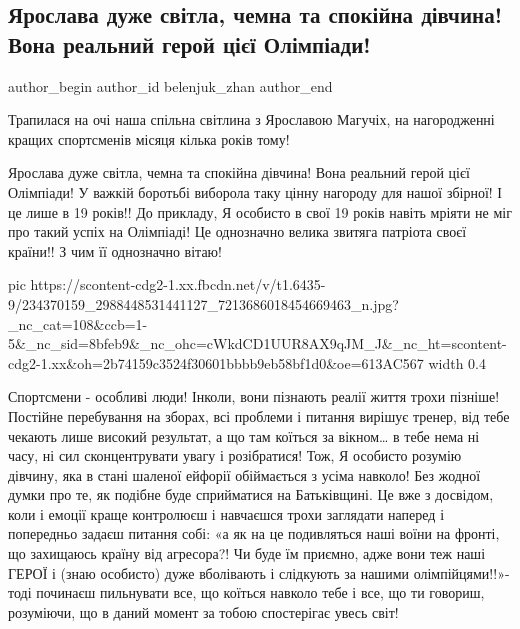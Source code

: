  
 
 
 
 
 
\subsection{Ярослава дуже світла, чемна та спокійна дівчина! Вона реальний герой цієї Олімпіади!}
\label{sec:10_08_2021.fb.belenjuk_zhan.1.maguchih_foto}
 
\ifcmt
 author_begin
   author_id belenjuk_zhan
 author_end
\fi

Трапилася на очі наша спільна світлина з Ярославою Магучіх, на нагородженні
кращих спортсменів місяця кілька років тому! 

Ярослава дуже світла, чемна та спокійна дівчина! Вона реальний герой цієї
Олімпіади! У важкій боротьбі виборола таку цінну нагороду для нашої збірної! І
це лише в 19 років!! До прикладу, Я особисто в свої 19 років навіть мріяти не
міг про такий успіх на Олімпіаді! Це однозначно велика звитяга патріота своєї
країни!! З чим її однозначно вітаю!

\ifcmt
  pic https://scontent-cdg2-1.xx.fbcdn.net/v/t1.6435-9/234370159_2988448531441127_7213686018454669463_n.jpg?_nc_cat=108&ccb=1-5&_nc_sid=8bfeb9&_nc_ohc=cWkdCD1UUR8AX9qJM_J&_nc_ht=scontent-cdg2-1.xx&oh=2b74159c3524f30601bbbb9eb58bf1d0&oe=613AC567
  width 0.4
\fi

Спортсмени - особливі люди! Інколи, вони пізнають реалії життя трохи пізніше!
Постійне перебування на зборах, всі проблеми і питання вирішує тренер, від тебе
чекають лише високий результат, а що там коїться за вікном… в тебе нема ні
часу, ні сил сконцентрувати увагу і розібратися! Тож, Я особисто розумію
дівчину, яка в стані шаленої ейфорії обіймається з усіма навколо! Без жодної
думки про те, як подібне буде сприйматися на Батьківщині. Це вже з досвідом,
коли і емоції краще контролюєш і навчаєшся трохи заглядати наперед і попередньо
задаєш питання собі: «а як на це подивляться наші воїни на фронті, що захищаюсь
країну від агресора?! Чи буде їм приємно, адже вони теж наші ГЕРОЇ і (знаю
особисто) дуже вболівають і слідкують за нашими олімпійцями!!»- тоді починаєш
пильнувати все, що коїться навколо тебе і все, що ти говориш, розуміючи, що в
даний момент за тобою спостерігає увесь світ!

